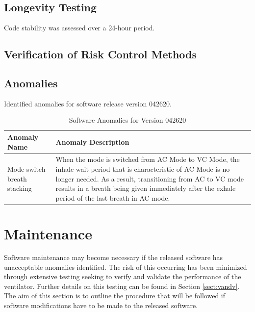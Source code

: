 \documentclass[]{article}
\begin{document}
\subsection{Longevity Testing}

Code stability was assessed over a 24-hour period.

\subsection{Verification of Risk Control Methods}
\label{sect:v_risk}


\subsection{Anomalies}
\label{sect:anomalies}

Identified anomalies for software release version 042620.

\begin{center}
	\begin{table}[h]
		\caption{Software Anomalies for Version 042620}
		\label{tab:sw_anom}
		\begin{tabular}{ |p{4cm}|p{10cm}|}
			
			\hline
			\textbf{Anomaly Name} & \textbf{Anomaly Description}  \\ \hline
			Mode switch breath stacking & When the mode is switched from AC Mode to VC Mode, the inhale wait period that is characteristic of AC Mode is no longer needed.  As a result, transitioning from AC to VC mode results in a breath being given immediately after the exhale period of the last breath in AC mode.\\ \hline 
		
			
		\end{tabular}
	\end{table}	
\end{center}






\clearpage


\section{Maintenance}
\label{sect:maintenance}

Software maintenance may become necessary if the released software has unacceptable anomalies identified.  The risk of this occurring has been minimized through extensive testing seeking to verify and validate the performance of the ventilator.  Further details on this testing can be found in Section \ref{sect:vandv}.  The aim of this section is to outline the procedure that will be followed if software modifications have to be made to the released software.
\end{document}
